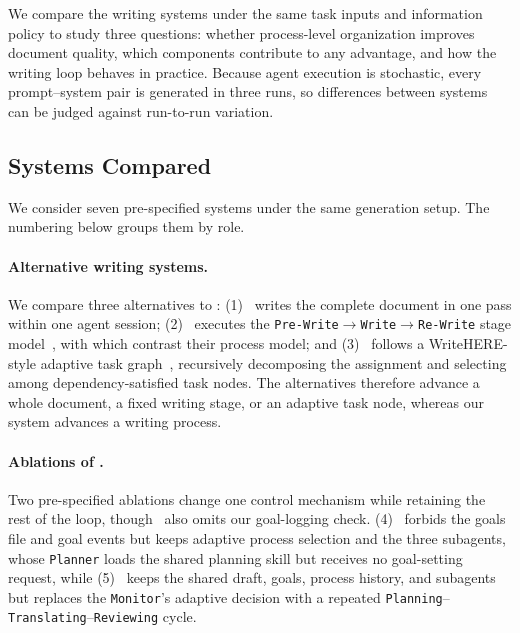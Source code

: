 We compare the writing systems under the same task inputs and information policy to study three questions: whether process-level organization improves document quality, which components contribute to any advantage, and how the writing loop behaves in practice.
Because agent execution is stochastic, every prompt--system pair is generated in three runs, so differences between systems can be judged against run-to-run variation.

\subsection{Systems Compared}
\label{sec:baselines}

We consider seven pre-specified systems under the same generation setup.
The numbering below groups them by role.

\paragraph{Alternative writing systems.}
We compare three alternatives to \condAgenticCogWriter: (1) \condSinglePass\ writes the complete document in one pass within one agent session; (2) \condStaged\ executes the \texttt{Pre-Write}$\rightarrow$\texttt{Write}$\rightarrow$\texttt{Re-Write} stage model~\citep{rohman1965pre}, with which \citet{flower1981cognitive} contrast their process model; and (3) \condTaskPlanning\ follows a WriteHERE-style adaptive task graph~\citep{xiong2025beyond}, recursively decomposing the assignment and selecting among dependency-satisfied task nodes.
The alternatives therefore advance a whole document, a fixed writing stage, or an adaptive task node, whereas our system advances a writing process.

\paragraph{Ablations of \condAgenticCogWriter.}
Two pre-specified ablations change one control mechanism while retaining the rest of the loop, though \condFixedOrder\ also omits our goal-logging check.
(4) \condNoGoals\ forbids the goals file and goal events but keeps adaptive process selection and the three subagents, whose \texttt{Planner} loads the shared planning skill but receives no goal-setting request, while (5) \condFixedOrder\ keeps the shared draft, goals, process history, and subagents but replaces the \texttt{Monitor}'s adaptive decision with a repeated \texttt{Planning}--\texttt{Translating}--\texttt{Reviewing} cycle.


